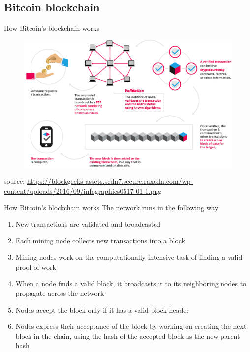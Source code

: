 \documentclass[11pt]{beamer}
\begin{document}

\subsection{Bitcoin blockchain}


\begin{frame}{How Bitcoin's blockchain works}
	\begin{figure}[]
		\centering
		\includegraphics  [scale=0.25]{Images/infographic}
	\end{figure}
	\begin{scriptsize}
		source: \href{https://blockgeeks.com/guides/what-is-blockchain-technology/}{https://blockgeeks-assets.scdn7.secure.raxcdn.com/wp-content/uploads/2016/09/infographics0517-01-1.png}
	\end{scriptsize}
\end{frame}


\begin{frame}{How Bitcoin's blockchain works}
	The network runs in the following way
	\begin{enumerate}
		\item New transactions are validated and broadcasted
		\item Each mining node collects new transactions into a block
		\item Mining nodes work on the computationally intensive task of finding a valid proof-of-work
		\item When a node finds a valid block, it broadcasts it to its neighboring nodes to propagate across the network
		\item Nodes accept the block only if it has a valid block header
		\item Nodes express their acceptance of the block by working on creating the next block in the chain, using the hash of the accepted block as the new parent hash
	\end{enumerate}
\end{frame}
\end{document}

